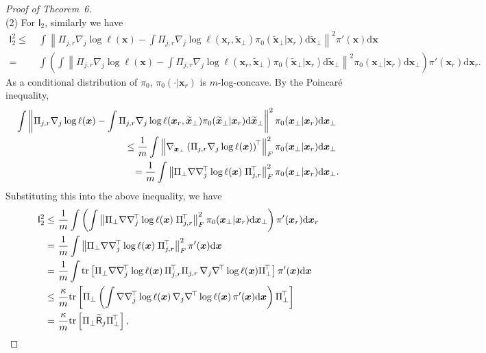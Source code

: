 \documentclass[10pt,a4paper]{amsart}
\newcommand{\Brac}[1]{\left(#1\right)}
\newcommand{\Fro}[1]{\norm{#1}_{\rm F}}
\newcommand{\Rectbrac}[1]{\left[#1\right]}
\newcommand{\bx}{{\boldsymbol{x}}}
\newcommand{\matT}{^{\!\top}}
\newcommand{\mdd}{\mathrm{d}}
\newcommand{\norm}[1]{\left\|#1\right\|}
\newcommand{\sfI}{\mathsf{I}}
\newcommand{\sfR}{\mathsf{R}}
\newcommand{\tr}{\text{\rm tr}}
\begin{document}
\begin{proof}[Proof of Theorem~6]
\ \\[-5pt]
\noindent
(2) For $\sfI_2$, similarly we have
{\small \begin{align*}
    \sfI_2^2 \le~& \int \norm{ \Pi_{j,r} \nabla_j \log \ell (\bx) - \int \Pi_{j,r} \nabla_j \log \ell(\bx_r,\widetilde{\bx}_\bot) \pi_0(\widetilde{\bx}_\bot|\bx_r) \mdd \widetilde{\bx}_\bot }^2 \pi'(\bx) \mdd \bx  \\
    =~& \int \Brac{ \int  \norm{ \Pi_{j,r} \nabla_j \log \ell (\bx) - \int \Pi_{j,r} \nabla_j \log \ell(\bx_r,\widetilde{\bx}_\bot) \pi_0(\widetilde{\bx}_\bot|\bx_r) \mdd \widetilde{\bx}_\bot }^2 \pi_0(\bx_\bot|\bx_r) \mdd \bx_\bot } \pi'(\bx_r) \mdd \bx_r.  
\end{align*}}
As a conditional distribution of $\pi_0$, $\pi_0(\cdot|\bx_r)$ is $m$-log-concave. By the Poincar\'e inequality,
\begin{align*}
    \int \norm{ \Pi_{j,r} \nabla_j \log \ell (\bx) - \int \Pi_{j,r} \nabla_j \log \ell(\bx_r,\widetilde{\bx}_\bot) \pi_0(\widetilde{\bx}_\bot|\bx_r) \mdd \widetilde{\bx}_\bot }^2 \pi_0(\bx_\bot|\bx_r) \mdd \bx_\bot & \\
    \le \frac{1}{m} \int \Fro{ \nabla_{\bx_\bot} \Brac{ \Pi_{j,r} \nabla_j \log \ell (\bx)}\matT  }^2 \pi_0(\bx_\bot|\bx_r) \mdd \bx_\bot& \\
    = \frac{1}{m} \int \Fro{ \Pi_\bot \nabla \nabla_j\matT \log \ell (\bx) \; \Pi_{j,r}\matT }^2 \pi_0(\bx_\bot|\bx_r) \mdd \bx_\bot&.
\end{align*}
Substituting this into the above inequality, we have 
\begin{equation}
\label{eqn:pf_LLIS_I2}
\begin{split}
    \sfI_2^2 \le~& \frac{1}{m} \int \Brac{ \int \Fro{ \Pi_\bot \nabla \nabla_j\matT \log \ell (\bx) \; \Pi_{j,r}\matT }^2 \pi_0(\bx_\bot|\bx_r) \mdd \bx_\bot } \pi'(\bx_r) \mdd \bx_r \\
    =~& \frac{1}{m} \int \Fro{ \Pi_\bot \nabla \nabla_j\matT \log \ell (\bx) \; \Pi_{j,r}\matT }^2 \pi'(\bx) \mdd \bx \\
    =~& \frac{1}{m} \int \tr \Rectbrac{ \Pi_\bot \nabla \nabla_j\matT \log \ell(\bx) \, \Pi_{j,r}\matT \Pi_{j,r} \, \nabla_j \nabla\matT \log \ell(\bx) \Pi_\bot\matT } \pi'(\bx) \mdd \bx \\
    \le~& \frac{\kappa}{m} \tr \Rectbrac{ \Pi_\bot \Brac{ \int \nabla \nabla_j\matT \log \ell(\bx) \, \nabla_j \nabla\matT \log \ell(\bx)\, \pi'(\bx) \mdd \bx } \Pi_\bot\matT } \\
    =~&\frac{\kappa}{m} \tr \Rectbrac{ \Pi_\bot \widetilde{\sfR}_j \Pi_\bot\matT },

\end{split}
\end{equation}
\end{proof}
\end{document}
